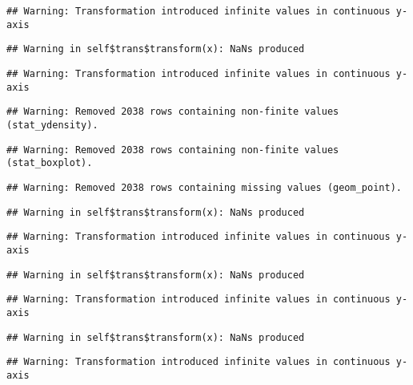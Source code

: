 \documentclass[a4paper,nobind]{templates/ociamthesis}
\begin{document}
\begin{landscape}
\begin{verbatim}
## Warning: Transformation introduced infinite values in continuous y-axis
\end{verbatim}

\begin{verbatim}
## Warning in self$trans$transform(x): NaNs produced
\end{verbatim}

\begin{verbatim}
## Warning: Transformation introduced infinite values in continuous y-axis
\end{verbatim}

\begin{verbatim}
## Warning: Removed 2038 rows containing non-finite values (stat_ydensity).
\end{verbatim}

\begin{verbatim}
## Warning: Removed 2038 rows containing non-finite values (stat_boxplot).
\end{verbatim}

\begin{verbatim}
## Warning: Removed 2038 rows containing missing values (geom_point).
\end{verbatim}

\begin{verbatim}
## Warning in self$trans$transform(x): NaNs produced
\end{verbatim}

\begin{verbatim}
## Warning: Transformation introduced infinite values in continuous y-axis
\end{verbatim}

\begin{verbatim}
## Warning in self$trans$transform(x): NaNs produced
\end{verbatim}

\begin{verbatim}
## Warning: Transformation introduced infinite values in continuous y-axis
\end{verbatim}

\begin{verbatim}
## Warning in self$trans$transform(x): NaNs produced
\end{verbatim}

\begin{verbatim}
## Warning: Transformation introduced infinite values in continuous y-axis
\end{verbatim}


\end{landscape}
\end{document}
